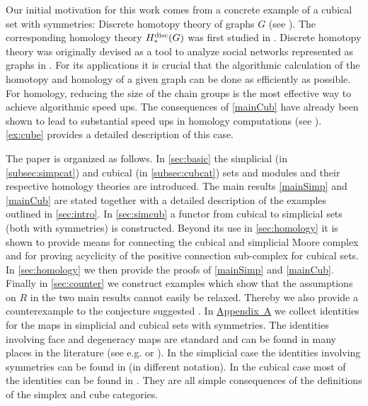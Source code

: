 \documentclass[12pt]{amsart}
\theoremstyle{plain}
\numberwithin{lemma}{\DefaultNumberTheoremWithin}
\numberwithin{claim}{\DefaultNumberTheoremWithin}
\numberwithin{theorem}{\DefaultNumberTheoremWithin}
\numberwithin{corollary}{\DefaultNumberTheoremWithin}
\numberwithin{proposition}{\DefaultNumberTheoremWithin}
\numberwithin{conjecture}{\DefaultNumberTheoremWithin}
\theoremstyle{definition}
\theoremstyle{definition}
\numberwithin{question}{\DefaultNumberTheoremWithin}
\theoremstyle{definition}
\numberwithin{problem}{\DefaultNumberTheoremWithin}
\theoremstyle{remark}
\numberwithin{remark}{\DefaultNumberTheoremWithin}
\theoremstyle{remark}
\numberwithin{example}{\DefaultNumberTheoremWithin}
\def\blt{*}
\begin{document}
Our initial motivation for this work comes from a concrete example of a cubical set with symmetries: Discrete homotopy theory of graphs $G$ (see \cite{HTgraphs06,ComparisonWithPath,carranza2022cubicalsettingdiscretehomotopy}). The corresponding homology theory $H^{\textnormal{disc}}_\blt(G)$ was first studied in \cite{DiscreteHomology}. Discrete homotopy theory was
originally devised as a tool to analyze social networks represented as graphs
in \cite{Atkin1,Atkin2}. For its applications it is crucial that the 
algorithmic calculation of the homotopy and homology of 
a given graph can be done as efficiently as possible. For homology, reducing the size of the chain groups is
the most effective way to achieve algorithmic speed ups.
The consequences of \ref{mainCub} have already been shown to 
lead to substantial speed ups in 
homology computations (see \cite{NathanAndChris}). 
\ref{ex:cube} provides a detailed description of this case. 




The paper is organized as follows. In 
\ref{sec:basic} the simplicial 
(in \ref{subsec:simpcat}) and cubical
(in \ref{subsec:cubcat}) sets and modules and
their respective homology theories are introduced. The main
results \ref{mainSimp} and \ref{mainCub} are stated
together with a detailed description of the examples outlined in \ref{sec:intro}.
In \ref{sec:simcub} a functor from cubical to simplicial sets (both with symmetries) is constructed. Beyond its use in \ref{sec:homology} it is shown to provide
means for connecting the cubical and simplicial Moore complex and for proving 
acyclicity of the 
positive connection sub-complex for cubical sets.
In \ref{sec:homology} we then provide the proofs of \ref{mainSimp} and \ref{mainCub}.
Finally in \ref{sec:counter} we 
construct examples
which show that the assumptions on $R$ in the two main results cannot easily be relaxed. Thereby we 
also provide a counterexample to the conjecture suggested
\cite[p. 59]{GodementBook}. In \hyperref[appendix]{Appendix~A}
we collect identities for the 
maps in simplicial and cubical sets with symmetries. The identities 
involving face and degeneracy maps are standard and can be found
in many places in the literature (see e.g. \cite[Chapter 8.1]{WeibelBook} or \cite{Kan}).
In the simplicial case the identities involving symmetries can be found in \cite{Grandis} (in different notation). In the cubical case most of the identities can be found
in \cite{GrandisMauri}. They are all simple consequences of the
definitions of the simplex and cube categories.
\end{document}
